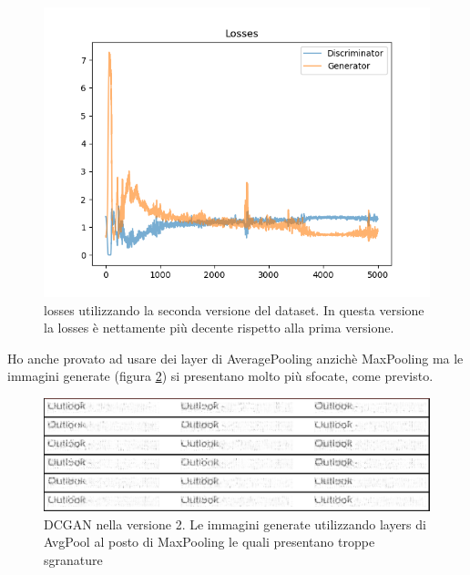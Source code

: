 \begin{figure}[!htb]
  \centering
  \begin{minipage}[b]{\textwidth}
    \includegraphics[width=\textwidth]{pictures/loss_maxpool.png}
    \caption{losses utilizzando la seconda versione del dataset. In questa versione la losses è nettamente più decente rispetto alla prima versione.}
    \label{fig:lossesv2}
  \end{minipage}
  \hfill
\end{figure}
Ho anche provato ad usare dei layer di AveragePooling anzichè MaxPooling ma le immagini generate (figura \ref{fig:avgpool}) si presentano molto più sfocate, come previsto.
\begin{figure}[!h]
  \centering
  \begin{minipage}[b]{\textwidth}
    \includegraphics[width=\textwidth]{pictures/avgpool.png}
    \caption{DCGAN nella versione 2. Le immagini generate utilizzando layers di AvgPool al posto di MaxPooling le quali presentano troppe sgranature}
    \label{fig:avgpool}
  \end{minipage}
  \hfill
\end{figure}\\


